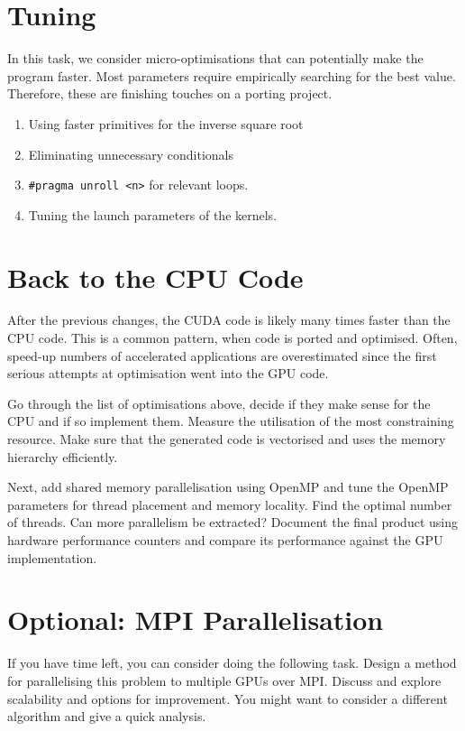 \documentclass{tufte-handout}
\begin{document}
\section{Tuning}
In this task, we consider micro-optimisations that can potentially
make the program faster. Most parameters require empirically searching
for the best value. Therefore, these are finishing touches on a porting project.

\begin{enumerate}
\item Using faster primitives for the inverse square root
\item Eliminating unnecessary conditionals
\item \Verb!#pragma unroll <n>! for relevant loops.
\item Tuning the launch parameters of the kernels.
\end{enumerate}

\section{Back to the CPU Code}
After the previous changes, the CUDA code is likely many times faster
than the CPU code. This is a common pattern, when code is ported and 
optimised. Often, speed-up numbers of accelerated applications are 
overestimated since the first serious attempts at optimisation went 
into the GPU code. 

Go through the list of optimisations above, decide if they make sense
for the CPU and if so implement them. Measure the utilisation of the
most constraining resource. Make sure that the generated code is vectorised 
and uses the memory hierarchy efficiently.

Next, add shared memory parallelisation using OpenMP and tune the OpenMP 
parameters for thread placement and memory locality. Find the optimal
number of threads.
Can more parallelism be extracted?
Document the final product using hardware performance counters and compare
its performance against the GPU implementation.

\section{Optional: MPI Parallelisation}
If you have time left, you can consider doing the following task.  Design a
method for parallelising this problem to multiple GPUs over
MPI. Discuss and explore scalability and options for improvement. 
You might want to consider a different algorithm and give a quick analysis.
\end{document}
